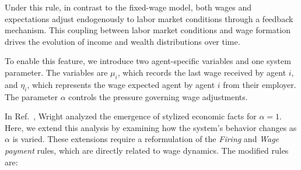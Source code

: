 Under this rule, in contrast to the fixed-wage model, both wages and expectations adjust endogenously to labor market conditions through a feedback mechanism. This coupling between labor market conditions and wage formation drives the evolution of income and wealth distributions over time. 

To enable this feature, we introduce two agent-specific variables and one system parameter. The variables are $\mu_{i}$, which records the last wage received by agent $i$, and $\eta_{i}$, which represents the wage expected agent by agent $i$ from their employer. The parameter $\alpha$ controls the pressure governing wage adjustments.

In Ref.~\cite{wright2008implicit}, Wright analyzed the emergence of stylized economic facts for $\alpha=1$. Here, we extend this analysis by examining how the system’s behavior changes as $\alpha$ is varied. These extensions require a reformulation of the \textit{Firing} and \textit{Wage payment} rules, which are directly related to wage dynamics. The modified rules are:

